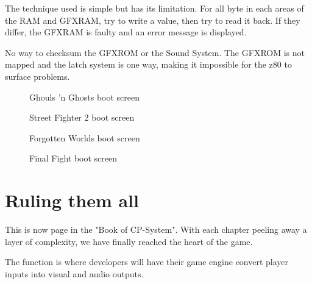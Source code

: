 The technique used is simple but has its limitation. For all byte in each areas of the RAM and GFXRAM, try to write a value, then try to read it back. If they differ, the GFXRAM is faulty and an error message is displayed. 

\begin{trivia}
No way to checksum the GFXROM or the Sound System. The GFXROM is not mapped and the latch system is one way, making it impossible for the z80 to surface problems.
\end{trivia}

\vfill
\begin{figure}[H]
\caption*{Ghouls 'n Ghosts boot screen}
\end{figure}


\begin{figure}[H]
\caption*{Street Fighter 2 boot screen}
\end{figure}











\begin{figure}[H]
\caption*{Forgotten Worlds boot screen}
\end{figure}



\vfill
\begin{figure}[H]
\caption*{Final Fight boot screen}
\end{figure}






\section{Ruling them all}
\label{this}
This is now \pageref{this} page in the "Book of CP-System". With each chapter peeling away a layer of complexity, we have finally reached the heart of the game. 

The function  is where developers will have their game engine convert player inputs into visual and audio outputs.

